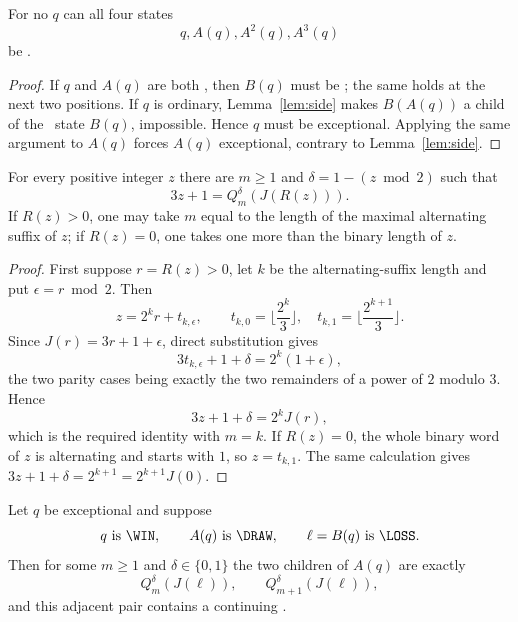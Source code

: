 \begin{corollary}\label{cor:no-four-win}
For no $q$ can all four states
\[
  q,A(q),A^2(q),A^3(q)
\]
be \WIN.
\end{corollary}

\begin{proof}
If $q$ and $A(q)$ are both \WIN, then $B(q)$ must be \LOSS; the same holds at
the next two positions. If $q$ is ordinary, Lemma~\ref{lem:side} makes
$B(A(q))$ a child of the \LOSS\ state $B(q)$, impossible. Hence $q$ must be
exceptional. Applying the same argument to $A(q)$ forces $A(q)$ exceptional,
contrary to Lemma~\ref{lem:side}.
\end{proof}

\begin{lemma}\label{lem:alt-lift}
For every positive integer $z$ there are $m\ge1$ and
$\delta=1-(z\bmod2)$ such that
\[
  3z+1=Q_m^\delta(J(R(z))).
\]
If $R(z)>0$, one may take $m$ equal to the length of the maximal alternating
suffix of $z$; if $R(z)=0$, one takes one more than the binary length of $z$.
\end{lemma}

\begin{proof}
First suppose $r=R(z)>0$, let $k$ be the alternating-suffix length and put
$\epsilon=r\bmod2$. Then
\[
 z=2^k r+t_{k,\epsilon},\qquad
 t_{k,0}=\Big\lfloor\frac{2^k}{3}\Big\rfloor,
 \quad t_{k,1}=\Big\lfloor\frac{2^{k+1}}{3}\Big\rfloor.
\]
Since $J(r)=3r+1+\epsilon$, direct substitution gives
\[
 3t_{k,\epsilon}+1+\delta=2^k(1+\epsilon),
\]
the two parity cases being exactly the two remainders of a power of $2$
modulo $3$. Hence
\[
 3z+1+\delta=2^kJ(r),
\]
which is the required identity with $m=k$. If $R(z)=0$, the whole binary word
of $z$ is alternating and starts with $1$, so
$z=t_{k,1}$. The same calculation gives
$3z+1+\delta=2^{k+1}=2^{k+1}J(0)$.
\end{proof}

\begin{lemma}\label{lem:exceptional-side}
Let $q$ be exceptional and suppose
\[
 q\text{ is \WIN},\qquad A(q)\text{ is \DRAW},\qquad
 \ell=B(q)\text{ is \LOSS}.
\]
Then for some $m\ge1$ and $\delta\in\{0,1\}$ the two children of $A(q)$ are
exactly
\[
  Q_m^\delta(J(\ell)),\qquad Q_{m+1}^\delta(J(\ell)),
\]
and this adjacent pair contains a continuing \DRAW.
\end{lemma}

